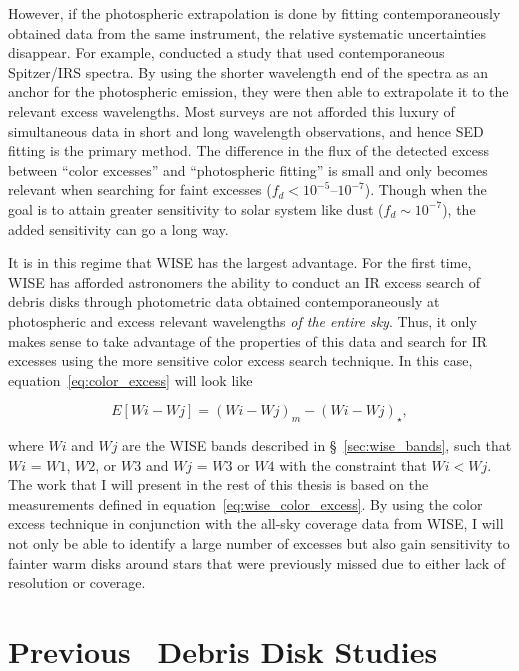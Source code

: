     However, if the photospheric extrapolation is done by fitting contemporaneously obtained data from the same instrument, the relative systematic uncertainties disappear. For example, \citet{Lawler2009} conducted a study that used contemporaneous Spitzer/IRS spectra. By using the shorter wavelength end of the spectra as an anchor for the photospheric emission, they were then able to extrapolate it to the relevant excess wavelengths. Most surveys are not afforded this luxury of simultaneous data in short and long wavelength observations, and hence SED fitting is the primary method. The difference in the flux of the detected excess between ``color excesses'' and ``photospheric fitting'' is small and only becomes relevant when searching for faint excesses ($f_d < 10^{-5}$--$10^{-7}$). Though when the goal is to attain greater sensitivity to solar system like dust ($f_d\sim10^{-7}$), the added sensitivity can go a long way.
    
    It is in this regime that WISE has the largest advantage. For the first time, WISE has afforded astronomers the ability to conduct an IR excess search of debris disks through photometric data obtained contemporaneously at photospheric and excess relevant wavelengths \textit{of the entire sky}. Thus, it only makes sense to take advantage of the properties of this data and search for IR excesses using the more sensitive color excess search technique. In this case, equation~\ref{eq:color_excess} will look like
    
    \begin{equation}\label{eq:wise_color_excess}
    E\left[Wi - Wj\right] = {\left(Wi - Wj \right)}_m - {\left(Wi- Wj \right)}_\star , 
    \end{equation}
    
    
 \noindent where $Wi$ and $Wj$ are the WISE bands described in \S~\ref{sec:wise_bands}, such that $Wi$ = $W1$, $W2$, or $W3$ and $Wj$ = $W3$ or $W4$ with the constraint that $Wi<Wj$. The work that I will present in the rest of this thesis is based on the measurements defined in equation~\ref{eq:wise_color_excess}. By using the color excess technique in conjunction with the all-sky coverage data from WISE, I will not only be able to identify a large number of excesses but also gain sensitivity to fainter warm disks  around stars that were previously missed due to either lack of resolution or coverage. 
    


    
\section{Previous \WS\ Debris Disk Studies}

